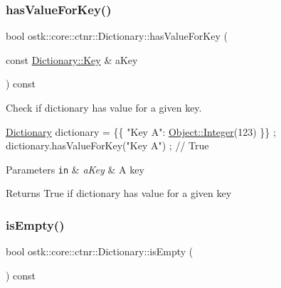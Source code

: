 \subsubsection{\texorpdfstring{has\+Value\+For\+Key()}{hasValueForKey()}}
{\footnotesize\ttfamily bool ostk\+::core\+::ctnr\+::\+Dictionary\+::has\+Value\+For\+Key (\begin{DoxyParamCaption}\item[{const \hyperlink{classostk_1_1core_1_1ctnr_1_1_dictionary_aa3b171525039535f342d271d27f90407}{Dictionary\+::\+Key} \&}]{a\+Key }\end{DoxyParamCaption}) const}



Check if dictionary has value for a given key. 


\begin{DoxyCode}
\hyperlink{classostk_1_1core_1_1ctnr_1_1_dictionary_a17166f1489683b8fcc5da6537f29de13}{Dictionary} dictionary = \{\{ \textcolor{stringliteral}{"Key A"}: \hyperlink{classostk_1_1core_1_1ctnr_1_1_object_af3bef3ae331e8e55662bf91a4cd5026f}{Object::Integer}(123) \}\} ;
dictionary.hasValueForKey(\textcolor{stringliteral}{"Key A"}) ; \textcolor{comment}{// True}
\end{DoxyCode}



\begin{DoxyParams}[1]{Parameters}
\mbox{\tt in}  & {\em a\+Key} & A key \\
\hline
\end{DoxyParams}
\begin{DoxyReturn}{Returns}
True if dictionary has value for a given key 
\end{DoxyReturn}
\mbox{\label{classostk_1_1core_1_1ctnr_1_1_dictionary_a549dfbdb0325a4937d2a12a0e9e1786d}} 
\subsubsection{\texorpdfstring{is\+Empty()}{isEmpty()}}
{\footnotesize\ttfamily bool ostk\+::core\+::ctnr\+::\+Dictionary\+::is\+Empty (\begin{DoxyParamCaption}{ }\end{DoxyParamCaption}) const}



